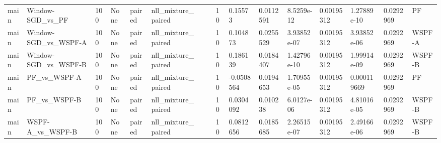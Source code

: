 \begin{tabular}{llllllllllllllll}
main & Window-SGD\_vs\_PF & 100 & None & paired & nll\_mixture\_paired &  &  & 10 & 0.15573 & 0.0112591 & 8.5259e-12 & 0.00195312 & 1.27889e-10 & 0.0292969 & PF \\
main & Window-SGD\_vs\_WSPF-A & 100 & None & paired & nll\_mixture\_paired &  &  & 10 & 0.104873 & 0.0255529 & 3.93852e-07 & 0.00195312 & 3.93852e-06 & 0.0292969 & WSPF-A \\
main & Window-SGD\_vs\_WSPF-B & 100 & None & paired & nll\_mixture\_paired &  &  & 10 & 0.186139 & 0.0184407 & 1.42796e-10 & 0.00195312 & 1.99914e-09 & 0.0292969 & WSPF-B \\
main & PF\_vs\_WSPF-A & 100 & None & paired & nll\_mixture\_paired &  &  & 10 & -0.0508564 & 0.0194653 & 1.70955e-05 & 0.00195312 & 0.000119669 & 0.0292969 & PF \\
main & PF\_vs\_WSPF-B & 100 & None & paired & nll\_mixture\_paired &  &  & 10 & 0.0304092 & 0.010238 & 6.0127e-06 & 0.00195312 & 4.81016e-05 & 0.0292969 & WSPF-B \\
main & WSPF-A\_vs\_WSPF-B & 100 & None & paired & nll\_mixture\_paired &  &  & 10 & 0.0812656 & 0.0185685 & 2.26515e-07 & 0.00195312 & 2.49166e-06 & 0.0292969 & WSPF-B \\
\hline
\end{tabular}
